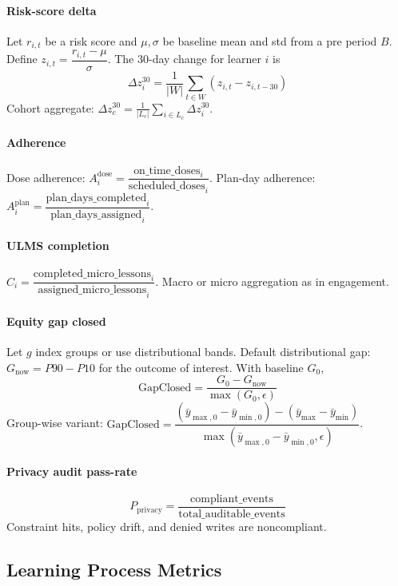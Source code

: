 \documentclass[11pt]{article}
\theoremstyle{plain}
\begin{document}
\paragraph{Risk-score delta}
Let $r_{i,t}$ be a risk score and $\mu,\sigma$ be baseline mean and std from a pre period $B$. Define $z_{i,t}=\dfrac{r_{i,t}-\mu}{\sigma}$. The 30-day change for learner $i$ is
\[
\Delta z_{i}^{30}=\frac{1}{|W|}\sum_{t\in W}\left(z_{i,t}-z_{i,t-30}\right)
\]
Cohort aggregate: $\Delta z_{c}^{30}=\frac{1}{|L_c|}\sum_{i\in L_c}\Delta z_{i}^{30}$.

\paragraph{Adherence}
Dose adherence: $A^{\text{dose}}_i=\dfrac{\text{on\_time\_doses}_i}{\text{scheduled\_doses}_i}$.
Plan-day adherence: $A^{\text{plan}}_i=\dfrac{\text{plan\_days\_completed}_i}{\text{plan\_days\_assigned}_i}$.

\paragraph{ULMS completion}
$C_i=\dfrac{\text{completed\_micro\_lessons}_i}{\text{assigned\_micro\_lessons}_i}$.
Macro or micro aggregation as in engagement.

\paragraph{Equity gap closed}
Let $g$ index groups or use distributional bands. Default distributional gap: $G_{\text{now}}=P90-P10$ for the outcome of interest. With baseline $G_0$,
\[
\text{GapClosed}=\frac{G_0-G_{\text{now}}}{\max(G_0,\epsilon)}
\]
Group-wise variant: $\text{GapClosed}=\dfrac{(\bar{y}_{\max,0}-\bar{y}_{\min,0})-(\bar{y}_{\max}-\bar{y}_{\min})}{\max(\bar{y}_{\max,0}-\bar{y}_{\min,0},\epsilon)}$.

\paragraph{Privacy audit pass-rate}
\[
P_{\text{privacy}}=\frac{\text{compliant\_events}}{\text{total\_auditable\_events}}
\]
Constraint hits, policy drift, and denied writes are noncompliant.

\subsection{Learning Process Metrics}
\end{document}
